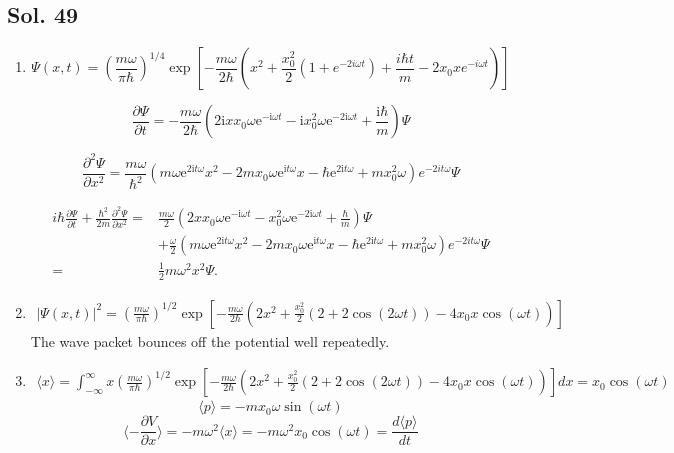 \subsection*{Sol. 49}
\begin{enumerate}
    \item 
    $$
\Psi(x,t)
= 
\left(\frac{m\omega}{\pi\hbar}\right)^{1/4}
\exp\left[
-\frac{m\omega}{2\hbar}
\left(
x^2+\frac{x_0^2}{2}(1+e^{-2i\omega t})+\frac{i\hbar t}{m}-2x_0xe^{-i\omega t}
\right)
\right]
$$

$$
\frac{\partial \Psi}{\partial t}
=
-\frac{m{\omega}}{2 \hbar}
  \left(2\mathrm{i}xx_{0} {\omega}\mathrm{e}^{-\mathrm{i}{\omega}t} - \mathrm{i}x_{0}^{2} {\omega}\mathrm{e}^{-2\mathrm{i}{\omega}t} + \frac{\mathrm{i}\hbar}{m}\right) \Psi
$$

$$
\frac{\partial^2 \Psi}{\partial x^2}
=
\frac{m{\omega} }{ \hbar^{2}}
\left(m{\omega}\mathrm{e}^{2\mathrm{i}t{\omega}} x^{2} - 2mx_{0} {\omega}\mathrm{e}^{\mathrm{i}t{\omega}} x - \hbar\mathrm{e}^{2\mathrm{i}t{\omega}} + mx_{0}^{2} {\omega}\right) e^{-2it\omega}\Psi
$$

\begin{align*}
    i\hbar\frac{\partial \Psi}{\partial t}
    +\frac{\hbar^2}{2m}
    \frac{\partial^2 \Psi}{\partial x^2}
    =&
    \frac{m{\omega}}{2 }
  \left(2xx_{0} {\omega}\mathrm{e}^{-\mathrm{i}{\omega}t} - x_{0}^{2} {\omega}\mathrm{e}^{-2\mathrm{i}{\omega}t} + \frac{\hbar}{m}\right) \Psi
    \\
   & + \frac{\omega}{2}\left(m{\omega}\mathrm{e}^{2\mathrm{i}t{\omega}} x^{2} - 2mx_{0} {\omega}\mathrm{e}^{\mathrm{i}t{\omega}} x - \hbar\mathrm{e}^{2\mathrm{i}t{\omega}} + mx_{0}^{2} {\omega}\right) e^{-2it\omega}\Psi\\
  =& \frac{1}{2}m\omega^2x^2\Psi.
\end{align*}
\item 
\begin{align*}
|\Psi(x,t)|^2
=
\left(\frac{m\omega}{\pi\hbar}\right)^{1/2}
\exp\left[
-\frac{m\omega}{2\hbar}
\left(
2x^2+\frac{x_0^2}{2}(2+2\cos(2\omega t))-4x_0x\cos(\omega t)
\right)
\right]    
\end{align*}
The wave packet bounces off the potential well repeatedly.

\item 
\begin{align*}
     \langle x\rangle = \int_{-\infty}^{\infty}
    x\left(\frac{m\omega}{\pi\hbar}\right)^{1/2}
\exp\left[
-\frac{m\omega}{2\hbar}
\left(
2x^2+\frac{x_0^2}{2}(2+2\cos(2\omega t))-4x_0x\cos(\omega t)
\right)
\right]   dx = x_0\cos(\omega t)
\end{align*}
$$
\langle p \rangle = -mx_0\omega\sin(\omega t)
$$
$$
\langle - \frac{\partial V}{\partial x}\rangle
=-m\omega^2\langle x\rangle =-m\omega^2x_0\cos(\omega t)
=\frac{d\langle p\rangle}{dt}
$$

\end{enumerate}

